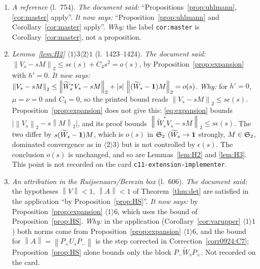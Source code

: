 \documentclass[11pt]{article}
\newcommand{\Pp}{P_+}\newcommand{\Pm}{P_-}
\newcommand{\Wt}{\widetilde W}\newcommand{\kt}{\widetilde k}
\newcommand{\norm}[1]{\left\lVert #1\right\rVert}\newcommand{\abs}[1]{\left|#1\right|}
\begin{document}
\begin{enumerate}[label=(C\arabic*),ref=C\arabic*,leftmargin=3em]
 \emph{Why:} the printed identity does not follow from the definitions: for $h'=0$ it would
 require $\Pp\Wt_s\Pm=-\Pp\Wt_s^*\Pm$.  The new identity follows from
 $G^\vee_s\Wt_s=\Pp\Wt_s-\Wt_s\Pp$.  The negative-time bound needs no separate argument:
 $\Wt_{-s}=\Wt_s^*$ (the group property, as in Correction~\ref{corr0924:C2}) gives
 $G_{-s}=-\Wt_sG_s\Wt_s^*$, and $\norm\cdot_2$ is unitarily invariant.  Finally
 $\norm{\Pp(e^{ish'}-\one)\Pm}\le\norm{e^{ish'}-\one}\le s\mu$, as in
 Proposition~\ref{prop:expansion} $\langle1\rangle3\langle2\rangle3$.  The conclusion of
 $\langle1\rangle6$ is unchanged.
\item\label{corr0924:C8} \emph{A reference} (l.~754).  \emph{The document said:}
 ``Propositions~\ref{prop:uhlmann}, \ref{cor:master} apply''.  \emph{It now says:}
 ``Proposition~\ref{prop:uhlmann} and Corollary~\ref{cor:master} apply''.  \emph{Why:} the label
 \texttt{cor:master} is Corollary~\ref{cor:master}, not a proposition.
\item\label{corr0924:C9} \emph{Lemma~\ref{lem:H2} $\langle1\rangle3\langle2\rangle1$} (l.~1423--1424).
 \emph{The document said:} $\norm{V_s-sM}_2\le s\epsilon(s)+C_4s^2=o(s)$, by
 Proposition~\ref{prop:expansion} with $h'=0$.  \emph{It now says:}
 $\norm{V_s-sM}_2\le\norm{\Wt_s^*V_s-sM}_2+|s|\,\norm{(\Wt_s-\one)M}_2=o(s)$.  \emph{Why:} for
 $h'=0$, $\mu=\nu=0$ and $C_4=0$, so the printed bound reads $\norm{V_s-sM}_2\le s\epsilon(s)$.
 Proposition~\ref{prop:expansion} does not give this: \eqref{eq:expansion} bounds
 $\bigl|\norm{V_s}_2-s\norm M_2\bigr|$, and its proof bounds $\norm{\Wt_s^*V_s-sM}_2\le
 s\epsilon(s)$.  The two differ by $s(\Wt_s-\one)M$, which is $o(s)$ in $\mathfrak S_2$ ($\Wt_s\to\one$
 strongly, $M\in\mathfrak S_2$, dominated convergence as in $\langle2\rangle3$) but is not controlled by
 $\epsilon(s)$.  The conclusion $o(s)$ is unchanged, and so are Lemmas~\ref{lem:H2} and
 \ref{lem:H3}.  This point is not recorded on the card \texttt{c11-extension-implementer}.
\item\label{corr0924:C10} \emph{An attribution in the Ruijsenaars/Berezin box} (l.~606).
 \emph{The document said:} the hypotheses $\norm V<1$, $\norm A<1$ of Theorem~\ref{thm:det} are
 satisfied in the application ``by Proposition~\ref{prop:HS}''.  \emph{It now says:} by
 Proposition~\ref{prop:expansion} $\langle1\rangle6$, which uses the bound of
 Proposition~\ref{prop:HS}.  \emph{Why:} in the application (Corollary~\ref{cor:varupper}
 $\langle1\rangle1$) both norms come from Proposition~\ref{prop:expansion} $\langle1\rangle6$, and
 the bound for $\norm A=\norm{\Pp U_s\Pm}$ is the step corrected in Correction~\ref{corr0924:C7};
 Proposition~\ref{prop:HS} alone bounds only the block $\Pm\Wt_s\Pp$.  Not recorded on the card.
\end{enumerate}%
\end{document}
